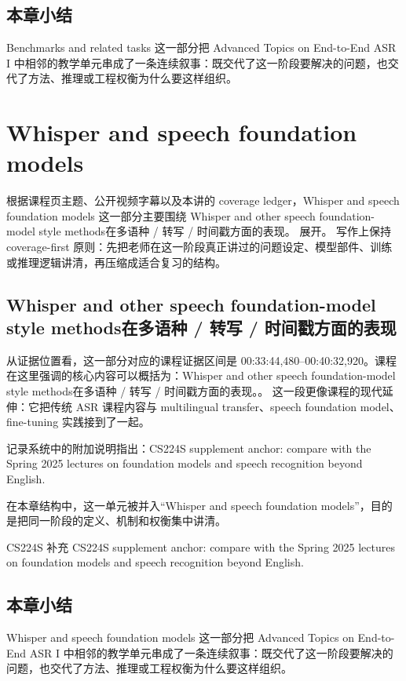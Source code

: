\documentclass[a4paper]{article}
\begin{document}
\subsection{本章小结}
Benchmarks and related tasks 这一部分把 Advanced Topics on End-to-End ASR I 中相邻的教学单元串成了一条连续叙事：既交代了这一阶段要解决的问题，也交代了方法、推理或工程权衡为什么要这样组织。

\section{Whisper and speech foundation models}
根据课程页主题、公开视频字幕以及本讲的 coverage ledger，Whisper and speech foundation models 这一部分主要围绕 Whisper and other speech foundation-model style methods在多语种 / 转写 / 时间戳方面的表现。 展开。
写作上保持 coverage-first 原则：先把老师在这一阶段真正讲过的问题设定、模型部件、训练或推理逻辑讲清，再压缩成适合复习的结构。

\subsection{Whisper and other speech foundation-model style methods在多语种 / 转写 / 时间戳方面的表现}
从证据位置看，这一部分对应的课程证据区间是 00:33:44,480--00:40:32,920。课程在这里强调的核心内容可以概括为：Whisper and other speech foundation-model style methods在多语种 / 转写 / 时间戳方面的表现。。
这一段更像课程的现代延伸：它把传统 ASR 课程内容与 multilingual transfer、speech foundation model、fine-tuning 实践接到了一起。

记录系统中的附加说明指出：CS224S supplement anchor: compare with the Spring 2025 lectures on foundation models and speech recognition beyond English.

在本章结构中，这一单元被并入“Whisper and speech foundation models”，目的是把同一阶段的定义、机制和权衡集中讲清。
\begin{knowledgebox}{CS224S 补充}
CS224S supplement anchor: compare with the Spring 2025 lectures on foundation models and speech recognition beyond English.
\end{knowledgebox}

\subsection{本章小结}
Whisper and speech foundation models 这一部分把 Advanced Topics on End-to-End ASR I 中相邻的教学单元串成了一条连续叙事：既交代了这一阶段要解决的问题，也交代了方法、推理或工程权衡为什么要这样组织。
\end{document}
